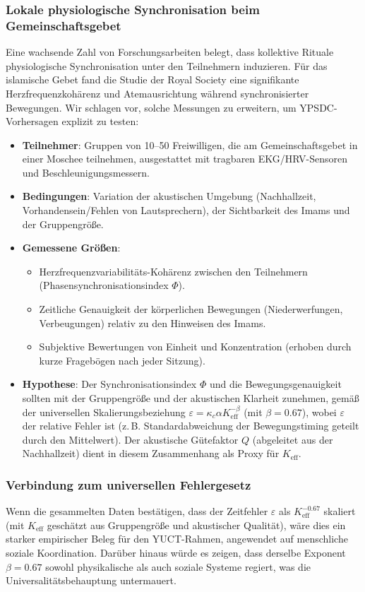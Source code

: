 \documentclass[12pt,a4paper]{article}
\newcommand{\Keff}{K_{\mathrm{eff}}}   %
\begin{document}
	\subsubsection{Lokale physiologische Synchronisation beim Gemeinschaftsgebet}
	Eine wachsende Zahl von Forschungsarbeiten belegt, dass kollektive Rituale physiologische Synchronisation unter den Teilnehmern induzieren. Für das islamische Gebet fand die Studie der Royal Society \cite{RoyalSociety2024} eine signifikante Herzfrequenzkohärenz und Atemausrichtung während synchronisierter Bewegungen. Wir schlagen vor, solche Messungen zu erweitern, um YPSDC-Vorhersagen explizit zu testen:
	
	\begin{itemize}
		\item \textbf{Teilnehmer}: Gruppen von 10–50 Freiwilligen, die am Gemeinschaftsgebet in einer Moschee teilnehmen, ausgestattet mit tragbaren EKG/HRV-Sensoren und Beschleunigungsmessern.
		\item \textbf{Bedingungen}: Variation der akustischen Umgebung (Nachhallzeit, Vorhandensein/Fehlen von Lautsprechern), der Sichtbarkeit des Imams und der Gruppengröße.
		\item \textbf{Gemessene Größen}:
		\begin{itemize}
			\item Herzfrequenzvariabilitäts-Kohärenz zwischen den Teilnehmern (Phasensynchronisationsindex \(\Phi\)).
			\item Zeitliche Genauigkeit der körperlichen Bewegungen (Niederwerfungen, Verbeugungen) relativ zu den Hinweisen des Imams.
			\item Subjektive Bewertungen von Einheit und Konzentration (erhoben durch kurze Fragebögen nach jeder Sitzung).
		\end{itemize}
		\item \textbf{Hypothese}: Der Synchronisationsindex \(\Phi\) und die Bewegungsgenauigkeit sollten mit der Gruppengröße und der akustischen Klarheit zunehmen, gemäß der universellen Skalierungsbeziehung \(\varepsilon = \kappa_c \alpha \Keff^{-\beta}\) (mit \(\beta=0.67\)), wobei \(\varepsilon\) der relative Fehler ist (z. B. Standardabweichung der Bewegungstiming geteilt durch den Mittelwert). Der akustische Gütefaktor \(Q\) (abgeleitet aus der Nachhallzeit) dient in diesem Zusammenhang als Proxy für \(\Keff\).
	\end{itemize}
	
	\subsubsection{Verbindung zum universellen Fehlergesetz}
	Wenn die gesammelten Daten bestätigen, dass der Zeitfehler \(\varepsilon\) als \(\Keff^{-0.67}\) skaliert (mit \(\Keff\) geschätzt aus Gruppengröße und akustischer Qualität), wäre dies ein starker empirischer Beleg für den YUCT-Rahmen, angewendet auf menschliche soziale Koordination. Darüber hinaus würde es zeigen, dass derselbe Exponent \(\beta=0.67\) sowohl physikalische als auch soziale Systeme regiert, was die Universalitätsbehauptung untermauert.
	
\end{document}
